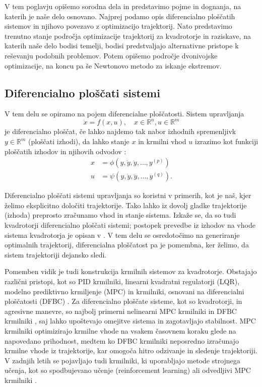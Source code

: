 \documentclass[mat2, tisk]{fmfdelo}
\begin{document}
V tem poglavju opišemo sorodna dela in predstavimo pojme in dognanja, na katerih je naše delo osnovano. Najprej podamo opis diferencialno ploščatih sistemov in njihovo povezavo z optimizacijo trajektorij. Nato predstavimo trenutno stanje področja optimizacije trajektorij za kvadrotorje in raziskave, na katerih naše delo bodisi temelji, bodisi predstvaljajo alternativne pristope k reševanju podobnih problemov. Potem opišemo področje dvonivojske optimizacije, na koncu pa še Newtonovo metodo za iskanje ekstremov.

\subsection{Diferencialno ploščati sistemi}
V tem delu se opiramo na pojem diferencialne ploščatosti. Sistem upravljanja
\begin{equation}
    \dot{x} = f(x, u), \quad x \in \mathbb{R}^n, u \in \mathbb{R}^m
\end{equation}
je diferencialno ploščat, če lahko najdemo tak nabor izhodnih spremenljivk $y \in \mathbb{R}^m$ (ploščati izhodi), da lahko stanje $x$ in krmilni vhod $u$ izrazimo kot funkciji ploščatih izhodov in njihovih odvodov \cite{murray1995differential}:
\begin{align}
    x &= \phi(y, \dot{y}, \ddot{y}, \dots, y^{(p)}) \\
    u &= \psi(y, \dot{y}, \ddot{y}, \dots, y^{(q)}).
\end{align}

Diferencialno ploščati sistemi upravljanja so koristni v primerih, kot je naš, kjer želimo eksplicitno določiti trajektorije. Tako lahko iz dovolj gladke trajektorije (izhoda) preprosto zračunamo vhod in stanje sistema. Izkaže se, da so tudi kvadrotorji diferencialno ploščati sistemi; postopek prevedbe iz izhodov na vhode sistema kvadrotorja je opisan v \cite{mellinger2011minimum}. V tem delu se osredotočimo na generiranje optimalnih trajektorij, diferencialna ploščatost pa je pomembna, ker želimo, da sistem trajektoriji dejansko sledi.

Pomemben vidik je tudi konstrukcija krmilnih sistemov za kvadrotorje. Obstajajo različni pristopi, kot so \ac{PID} krmilniki, linearni kvadratni regulatorji (\acs{LQR}), modelno prediktivno krmiljenje (\acs{MPC}) in krmilniki, osnovani na diferencialni ploščatosti (\acs{DFBC}) \cite{lee2010geometric}. Za diferencialno ploščate sisteme, kot so kvadrotorji, in agresivne manevre, so najbolj primerni nelinearni \ac{MPC} krmilniki in \ac{DFBC} krmilniki \cite{sun2022comparative}, saj lahko upoštevajo omejitve sistema in zagotavljajo stabilnost. \ac{MPC} krmilniki optimizirajo krmilne vhode na vsakem časovnem koraku glede na napovedano prihodnost, medtem ko \ac{DFBC} krmilniki neposredno izračunajo krmilne vhode iz trajektorije, kar omogoča hitro odzivanje in sledenje trajektoriji. V zadnjih letih se pojavljajo tudi krmilniki, ki uporabljajo metode strojnega učenja, kot so spodbujevano učenje (reinforcement learning) \cite{hwangbo2017control} ali odvedljivi \ac{MPC} krmilniki \cite{amos2018differentiable}.
\end{document}
